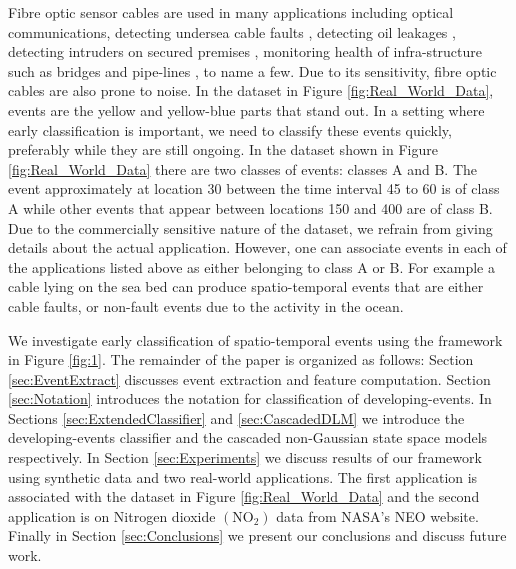 \documentclass[11pt]{article}
\begin{document}
	Fibre optic sensor cables are used in many applications including optical communications, detecting undersea cable faults \cite{jiang2009technological}, detecting oil leakages \cite{nikles2004leakage}, detecting intruders on secured premises \cite{griffiths1995developments}, monitoring health of infra-structure such as bridges and pipe-lines \cite{li2004recent}, to name a few. Due to its sensitivity, fibre optic cables are also prone to noise. In the dataset in Figure \ref{fig:Real_World_Data}, events are the yellow and yellow-blue parts that stand out. In a setting where early classification is  important, we need to classify these events quickly, preferably while they are still ongoing. In the dataset shown in Figure \ref{fig:Real_World_Data} there are two classes of events: classes A and B. The event approximately at location 30 between the time interval  45 to 60 is of class A while other events that appear between locations 150 and 400  are of class B. Due to the commercially sensitive nature of the dataset, we refrain from giving details about the actual application. However, one can associate events in each of the applications listed above as either belonging to class A or B. For example a cable lying on the sea bed can produce spatio-temporal events that are either cable faults, or non-fault events due to the activity in the ocean. 
	
	
	We investigate early classification of spatio-temporal events using the framework in Figure \ref{fig:1}. The remainder of the paper is organized as follows: Section \ref{sec:EventExtract} discusses event extraction and feature computation. Section \ref{sec:Notation}  introduces the notation for classification of developing-events. In Sections \ref{sec:ExtendedClassifier} and  \ref{sec:CascadedDLM} we introduce the developing-events classifier and the cascaded non-Gaussian state space models respectively. %
	In Section \ref{sec:Experiments} we discuss results of our framework using synthetic data and two real-world applications. The first  application is associated with the dataset in Figure \ref{fig:Real_World_Data} and the second application is on Nitrogen dioxide $(\text{NO}_2)$ data from NASA's  NEO \cite{OMINO2} website. Finally in Section \ref{sec:Conclusions} we present our conclusions and discuss future work.  
	
		
\end{document}
